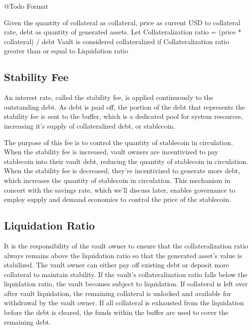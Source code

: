 \documentclass[12pt]{article}
\begin{document}
\begin{flushleft}
	\color{red} @Todo Format
\end{flushleft}

Given the quantity of collateral as collateral, price as current USD to collateral rate, debt as quantity of generated assets.
Let Collateralization ratio = (price * collateral) / debt
Vault is considered collateralized if Collateralization ratio greater than or equal to Liquidation ratio


\subsection{Stability Fee}

An interest rate, called the stability fee, is applied continuously to the outstanding debt. As debt is paid off, the portion of the debt that represents the stability fee is sent to the buffer, which is a dedicated pool for system resources, increasing it's supply of collateralized debt, or stablecoin.

The purpose of this fee is to control the quantity of stablecoin in circulation. When the stability fee is increased, vault owners are incentivized to pay stablecoin into their vault debt, reducing the quantity of stablecoin in circulation. When the stability fee is decreased, they're incentivized to generate more debt, which increases the quantity of stablecoin in circulation. This mechanism in concert with the savings rate, which we'll discuss later, enables governance to employ supply and demand economics to control the price of the stablecoin.

\subsection{Liquidation Ratio}

It is the responsibility of the vault owner to ensure that the collateralization ratio always remains above the liquidation ratio so that the generated asset's value is stabilized. The vault owner can either pay off existing debt or deposit more collateral to maintain stability. If the vault's collateralization ratio falls below the liquidation ratio, the vault becomes subject to liquidation. If collateral is left over after vault liquidation, the remaining collateral is unlocked and available for withdrawal by the vault owner. If all collateral is exhausted from the liquidation before the debt is cleared, the funds within the buffer are used to cover the remaining debt.
\end{document}
